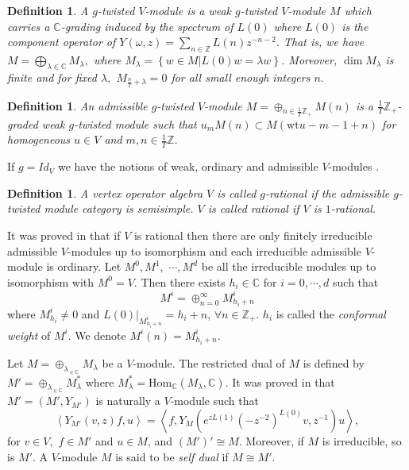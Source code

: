 \documentclass{article}
\newtheorem{definition}[lemma]{Definition}
\begin{document}
	\begin{definition}
		
		A $g$-\emph{twisted $V$-module} is a weak $g$-twisted $V$-module
		$M$ which carries a $\mathbb{C}$-grading induced by the spectrum
		of $L(0)$ where $L(0)$ is the component operator of $Y(\omega,z)=\sum_{n\in\mathbb{Z}}L(n)z^{-n-2}.$
		That is, we have $M=\bigoplus_{\lambda\in\mathbb{C}}M_{\lambda},$
		where $M_{\lambda}=\left\{ w\in M|L(0)w=\lambda w\right\} $. Moreover,
		$\dim M_{\lambda}$ is finite and for fixed $\lambda,$ $M_{\frac{n}{T}+\lambda}=0$
		for all small enough integers $n.$
		
	\end{definition}
	
	\begin{definition}An \emph{admissible $g$-twisted $V$-module} $M=\oplus_{n\in\frac{1}{T}\mathbb{Z}_{+}}M\left(n\right)$
		is a $\frac{1}{T}\mathbb{Z}_{+}$-graded weak $g$-twisted module
		such that $u_{m}M\left(n\right)\subset M\left(\mbox{wt}u-m-1+n\right)$
		for homogeneous $u\in V$ and $m,n\in\frac{1}{T}\mathbb{Z}.$
		
	\end{definition}
	
	If $g=Id_{V}$ we have the notions of weak, ordinary and admissible
	$V$-modules \cite{DLM2}.
	
	\begin{definition}A vertex operator algebra $V$ is called \emph{$g$-rational}
		if the admissible $g$-twisted module category is semisimple. $V$
		is called \emph{rational} if $V$ is $1$-rational. \end{definition}
	
	It was proved in \cite{DLM2} that if $V$ is rational then there
	are only finitely irreducible admissible $V$-modules up to isomorphism
	and each irreducible admissible $V$-module is ordinary. Let $M^{0},M^{1},$
	$\cdots,M^{d}$ be all the irreducible modules up to isomorphism with
	$M^{0}=V$. Then there exists $h_{i}\in\mathbb{C}$ for $i=0,\cdots,d$
	such that
	\[
	M^{i}=\oplus_{n=0}^{\infty}M_{h_{i}+n}^{i}
	\]
	where $M_{h_{i}}^{i}\not=0$ and $L\left(0\right)|_{M_{h_{i}+n}^{i}}=h_{i}+n$,
	$\forall n\in\mathbb{Z}_{+}$. $h_{i}$ is called the \emph{conformal
		weight} of $M^{i}$. We denote $M^{i}\left(n\right)=M_{h_{i}+n}^{i}.$
	
	Let $M=\oplus_{\lambda_{\in\mathbb{C}}}M_{\lambda}$ be a $V$-module.
	The restricted dual of $M$ is defined by $M'=\oplus_{\lambda_{\in\mathbb{C}}}M_{\lambda}^{\ast}$
	where $M_{\lambda}^{\ast}=\text{Hom}_{\mathbb{C}}\left(M_{\lambda},\mathbb{C}\right).$
	It was proved in \cite{FHL} that $M'=\left(M',Y_{M'}\right)$ is
	naturally a $V$-module such that
	\[
	\left\langle Y_{M'}\left(v,z\right)f,u\right\rangle =\left\langle f,Y_{M}\left(e^{zL\left(1\right)}\left(-z^{-2}\right)^{L\left(0\right)}v,z^{-1}\right)u\right\rangle ,
	\]
	for $v\in V,$ $f\in M'$ and $u\in M$, and $\left(M'\right)'\cong M$.
	Moreover, if $M$ is irreducible, so is $M'$. A $V$-module $M$
	is said to be \emph{self dual} if $M\cong M'$.
	
\end{document}
